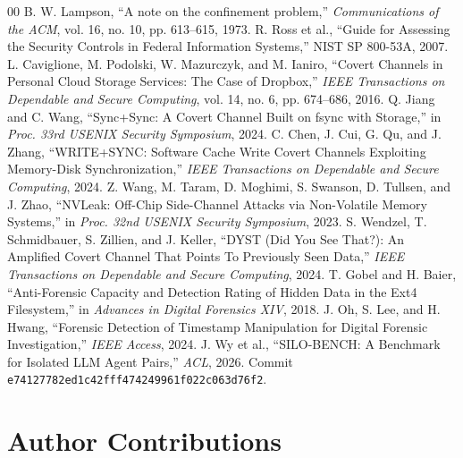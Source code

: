 \documentclass[conference]{IEEEtran}
\begin{document}
\begin{thebibliography}{00}
 B. W. Lampson, ``A note on the confinement problem,'' \textit{Communications of the ACM}, vol. 16, no. 10, pp. 613--615, 1973.
 R. Ross et al., ``Guide for Assessing the Security Controls in Federal Information Systems,'' NIST SP 800-53A, 2007.
 L. Caviglione, M. Podolski, W. Mazurczyk, and M. Ianiro, ``Covert Channels in Personal Cloud Storage Services: The Case of Dropbox,'' \textit{IEEE Transactions on Dependable and Secure Computing}, vol. 14, no. 6, pp. 674--686, 2016.
 Q. Jiang and C. Wang, ``Sync+Sync: A Covert Channel Built on fsync with Storage,'' in \textit{Proc. 33rd USENIX Security Symposium}, 2024.
 C. Chen, J. Cui, G. Qu, and J. Zhang, ``WRITE+SYNC: Software Cache Write Covert Channels Exploiting Memory-Disk Synchronization,'' \textit{IEEE Transactions on Dependable and Secure Computing}, 2024.
 Z. Wang, M. Taram, D. Moghimi, S. Swanson, D. Tullsen, and J. Zhao, ``NVLeak: Off-Chip Side-Channel Attacks via Non-Volatile Memory Systems,'' in \textit{Proc. 32nd USENIX Security Symposium}, 2023.
 S. Wendzel, T. Schmidbauer, S. Zillien, and J. Keller, ``DYST (Did You See That?): An Amplified Covert Channel That Points To Previously Seen Data,'' \textit{IEEE Transactions on Dependable and Secure Computing}, 2024.
 T. Gobel and H. Baier, ``Anti-Forensic Capacity and Detection Rating of Hidden Data in the Ext4 Filesystem,'' in \textit{Advances in Digital Forensics XIV}, 2018.
 J. Oh, S. Lee, and H. Hwang, ``Forensic Detection of Timestamp Manipulation for Digital Forensic Investigation,'' \textit{IEEE Access}, 2024.
 J. Wy et al., ``SILO-BENCH: A Benchmark for Isolated LLM Agent Pairs,'' \textit{ACL}, 2026. Commit \texttt{e74127782ed1c42fff474249961f022c063d76f2}.
\end{thebibliography}

\section*{Author Contributions}
\end{document}
